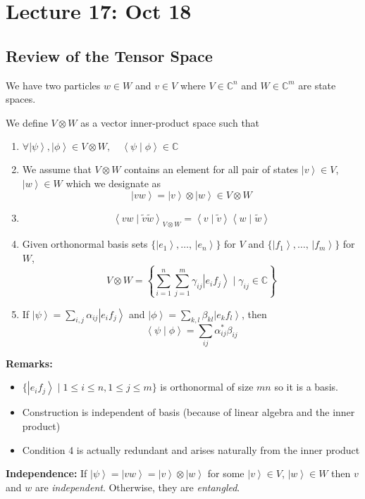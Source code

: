 \documentclass[12pt]{article}
\newcommand{\brak}[1]{\left\langle #1 \right\rangle}
\newcommand{\C}{\mathbb{C}}
\newcommand{\ket}[1]{\left\vert #1 \right\rangle}
\begin{document}
\section*{Lecture 17: Oct 18}
\subsection*{Review of the Tensor Space}
We have two particles $w \in W$ and $v \in V$ where $V \in \C^n$ and $W \in \C^m$ are state spaces. 

We define $V \otimes W$ as a vector inner-product space such that 
\begin{enumerate}
    \item $\forall \ket \psi, \ket \phi \in V \otimes W, \quad \brak{\psi \; | \; \phi} \in \C$
    \item We assume that $V \otimes W$ contains an element for all pair of states $\ket v \in V$, $\ket w \in W$ which we designate as 
    \[\ket{vw} = \ket v \otimes \ket w \in V\otimes W\]
    \item \[\brak{vw \; | \; \tilde v \tilde w}_{V \otimes W} = \brak{v \; | \; \tilde v}\brak{w \; | \; \tilde w}\]
    \item Given orthonormal basis sets $\{\ket{e_1}, \dots,\, \ket{e_n}\}$ for $V$ and $\{\ket{f_1}, \dots,\, \ket{f_m}\}$ for $W$, 
    \[V \otimes W = \left\{\sum_{i=1}^n \sum_{j=1}^m \gamma_{ij} \ket{e_i f_j} \; | \;\gamma_{ij} \in \C\right\}\]
    \item If $\ket \psi = \sum_{i, j} \alpha_{ij} \ket{e_i f_j}$ and $\ket{\phi} = \sum_{k,l} \beta_{kl} \ket{e_k f_l}$, then  
    \[\brak{\psi \; | \; \phi} = \sum_{ij} \alpha^*_{ij} \beta_{ij}\]
\end{enumerate}

\textbf{Remarks:} 
\begin{itemize}
    \item $\{\ket{e_i f_j} \; | \; 1 \leq i \leq n, 1 \leq j \leq m\}$ is orthonormal of size $mn$ so it is a basis. 
    \item Construction is independent of basis (because of linear algebra and the inner product)
    \item Condition 4 is actually redundant and arises naturally from the inner product
\end{itemize}

\textbf{Independence:} If $\ket \psi = \ket{vw} = \ket v \otimes \ket w$ for some $\ket v \in V$, $\ket w \in W$ then $v$ and $w$ are \emph{independent}. Otherwise, they are \emph{entangled}.
\end{document}
